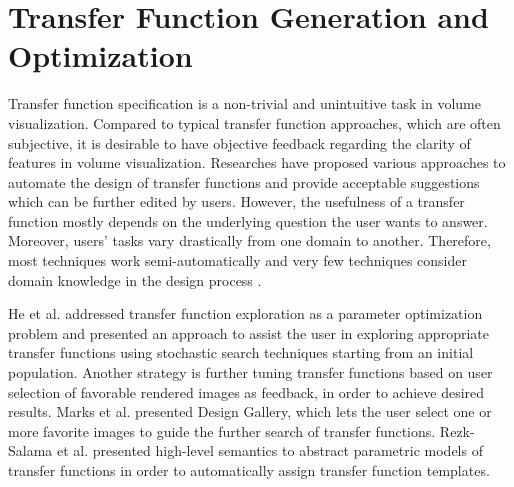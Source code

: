 \documentclass{egpubl}
\begin{document}
\section{Transfer Function Generation and Optimization}
Transfer function specification is a non-trivial and unintuitive task in volume visualization. Compared to typical transfer function approaches, which are often subjective, it is desirable to have objective feedback regarding the clarity of features in volume visualization.
Researches have proposed various approaches to automate the design of transfer functions and provide acceptable suggestions which can be further edited by users. However, the usefulness of a transfer function mostly depends on the underlying question the user wants to answer. Moreover, users' tasks vary drastically from one domain to another. Therefore, most techniques work semi-automatically and very few techniques consider domain knowledge in the design process \cite{zudilova-seinstra_trends_2008}.

He et al. \cite{he_generation_1996} addressed transfer function exploration as a parameter optimization problem and presented an approach to assist the user in exploring appropriate transfer functions using stochastic search techniques starting from an initial population.
Another strategy is further tuning transfer functions based on user selection of favorable rendered images as feedback, in order to achieve desired results.
Marks et al. \cite{marks_design_1997} presented Design Gallery, which lets the user select one or more favorite images to guide the further search of transfer functions.
Rezk-Salama et al. \cite{rezk-salama_automatic_2000} presented high-level semantics to abstract parametric models of transfer functions in order to automatically assign transfer function templates.
\end{document}
